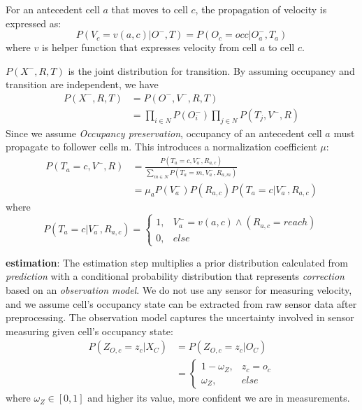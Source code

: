 \begin{my_enumerate}
For an antecedent cell $a$ that moves to cell $c$, the propagation of velocity is expressed as:
\begin{equation}
P(V_c=v(a, c)| O^-, T) = P(O_c=occ|O^-_a, T_a) \label{eq:6}
\end{equation}
where $v$ is helper function that expresses velocity from cell $a$ to cell $c$.

$P(X^-, R, T)$ is the joint distribution for transition. By assuming occupancy and transition are independent, we have
\begin{align}
P(X^-, R, T) &= P(O^-, V^-, R, T) \\
             &= \prod_{i \in N} P(O_i^-) \prod_{j \in N} P(T_j, V^-, R)
\end{align}
Since we assume \textit{Occupancy preservation}, occupancy of an antecedent cell $a$ must propagate to follower cells m. This introduces a normalization coefficient $\mu$:
\begin{align}
P(T_a=c, V^-, R) &= \frac{P(T_a=c, V^-_a, R_{a,c})}{\sum_{m \in N}P(T_a=m, V^-_a, R_{a,m})} \\
                 &= \mu_a P(V_a^-) P(R_{a,c})P(T_a=c|V_a^-, R_{a, c}) \label{eq:t}
\end{align}
where 
\begin{equation}
P(T_a=c|V^-_a, R_{a,c}) =
  \begin{cases}
  1, & V_a^- = v(a, c) \wedge (R_{a,c} = reach) \\
  0, & else
  \end{cases} 
  \label{eq:t1}
\end{equation}

\item \textbf{estimation}: The estimation step multiplies a prior distribution calculated from \textit{prediction} with a conditional probability distribution that represents \textit{correction} based on an \textit{observation model}. We do not use any sensor for measuring velocity, and we assume cell's occupancy state can be extracted from raw sensor data after preprocessing. The observation model captures the uncertainty involved in sensor measuring given cell's occupancy state:
\begin{align}
P(Z_{O,c}=z_c|X_C) &= P(Z_{O,c}=z_c|O_C) \\
				   &=
				   \begin{cases}
				   1-\omega_Z, & z_c = o_c \\
				   \omega_Z,   & else
				   \end{cases}
\end{align}
where $\omega_Z \in [0,1]$ and higher its value, more confident we are in measurements. 
\end{my_enumerate}


